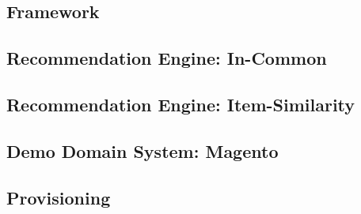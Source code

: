 \setmonofont{Consolas}

\subsection{Framework}

% 

\subsection{Recommendation Engine: In-Common}

% 

\subsection{Recommendation Engine: Item-Similarity}

% 

\subsection{Demo Domain System: Magento}

% 

\subsection{Provisioning}
\label{appendix-soure-code-provisioning}

% 